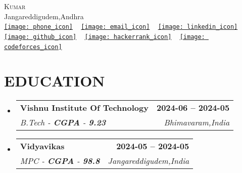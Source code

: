 \documentclass[letterpaper,11pt]{article}
\makeatletter
\newcommand{\resumeSubheading}[4]{
        \vspace{-2pt}\item
          \begin{tabular*}{1.0\textwidth}[t]{l@{\extracolsep{\fill}}r}
            \textbf{\large#1} & \textbf{\small #2} \\
            \textit{\large#3} & \textit{\small #4} \\
            
          \end{tabular*}\vspace{-7pt}
      }
\newcommand{\resumeSubHeadingListStart}{\begin{itemize}[leftmargin=0.0in, label={}]}
\newcommand{\resumeSubHeadingListEnd}{\end{itemize}}
\makeatother
\begin{document}
      
    
        \begin{center}
            {\Huge \scshape Kumar} \\ \vspace{1pt}
            Jangareddigudem,Andhra \\ \vspace{1pt}
            \small 
            \href{tel:+8179327201}{\texttt{[image: phone\_icon]}}\hspace{0.2em} ~
            \href{mailto:bhargavvenkat515@gmail.com}{\texttt{[image: email\_icon]}}\hspace{0.2em} ~ 
            \href{https://www.linkedin.com/in/bhargav-venkat-polireddy-77153221b/}{\texttt{[image: linkedin\_icon]}}\hspace{0.2em} ~
            \href{github.com/BhargavAlpha}{\texttt{[image: github\_icon]}}\hspace{0.2em} ~
            \href{hackerrank.com}{\texttt{[image: hackerrank\_icon]}}\hspace{0.2em} ~
            \href{codeforces.com}{\texttt{[image: codeforces\_icon]}}\hspace{0.2em} ~
         
            \vspace{-8pt}
        \end{center}
    
        \section{EDUCATION}
        \resumeSubHeadingListStart
          
              \resumeSubheading
                {Vishnu Institute Of Technology}{2024-06 -- 2024-05}
                {B.Tech - \textbf{CGPA} - \textbf{9.23}} {Bhimavaram,India}
            
              \resumeSubheading
                {Vidyavikas}{2024-05 -- 2024-05}
                {MPC - \textbf{CGPA} - \textbf{98.8}} {Jangareddigudem,India}
            
        \resumeSubHeadingListEnd
    
\end{document}
